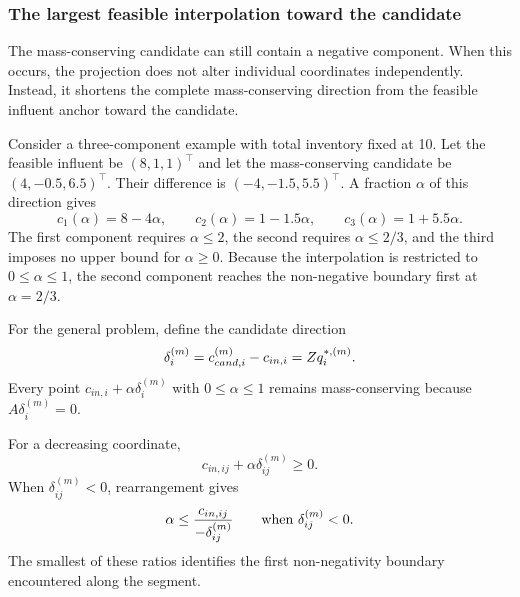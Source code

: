 \subsubsection{The largest feasible interpolation toward the candidate}

The mass-conserving candidate can still contain a negative component. When this occurs, the projection does not alter individual coordinates independently. Instead, it shortens the complete mass-conserving direction from the feasible influent anchor toward the candidate.

Consider a three-component example with total inventory fixed at 10. Let the feasible influent be
$(8,1,1)^\top$
and let the mass-conserving candidate be
$(4,-0.5,6.5)^\top$.
Their difference is
$(-4,-1.5,5.5)^\top$.
A fraction $\alpha$ of this direction gives
\[
c_1(\alpha)=8-4\alpha,\qquad
c_2(\alpha)=1-1.5\alpha,\qquad
c_3(\alpha)=1+5.5\alpha.
\]
The first component requires $\alpha\leq2$, the second requires $\alpha\leq2/3$, and the third imposes no upper bound for $\alpha\geq0$. Because the interpolation is restricted to $0\leq\alpha\leq1$, the second component reaches the non-negative boundary first at $\alpha=2/3$.

For the general problem, define the candidate direction
\begin{equation}
\equationname{Candidate direction from the feasible influent anchor}
\delta_i^{(m)}=c_{cand,i}^{(m)}-c_{in,i}=Zq_i^{*,(m)}.
\label{eq:projection_candidate_direction}
\end{equation}
Every point
$c_{in,i}+\alpha\delta_i^{(m)}$
with $0\leq\alpha\leq1$ remains mass-conserving because
$A\delta_i^{(m)}=0$.

For a decreasing coordinate,
\[
c_{in,ij}+\alpha\delta_{ij}^{(m)}\geq0.
\]
When $\delta_{ij}^{(m)}<0$, rearrangement gives
\begin{equation}
\equationname{Interpolation bound for a decreasing concentration}
\alpha\leq\frac{c_{in,ij}}{-\delta_{ij}^{(m)}}
\qquad\text{when }\delta_{ij}^{(m)}<0.
\label{eq:projection_coordinate_bound}
\end{equation}
The smallest of these ratios identifies the first non-negativity boundary encountered along the segment.

